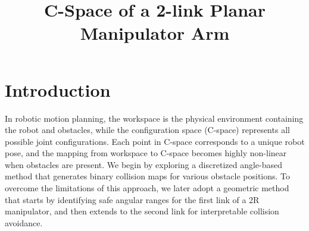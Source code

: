 \documentclass[12pt]{article}
\title{C-Space of a 2-link Planar Manipulator Arm}
\date{}
\begin{document}
\maketitle
\section*{Introduction}
In robotic motion planning, the workspace is the physical environment containing the robot and obstacles, while the configuration space (C-space) represents all possible joint configurations. Each point in C-space corresponds to a unique robot pose, and the mapping from workspace to C-space becomes highly non-linear when obstacles are present. We begin by exploring a discretized angle-based method that generates binary collision maps for various obstacle positions. To overcome the limitations of this approach, we later adopt a geometric method that starts by identifying safe angular ranges for the first link of a 2R manipulator, and then extends to the second link for interpretable collision avoidance.
\end{document}
